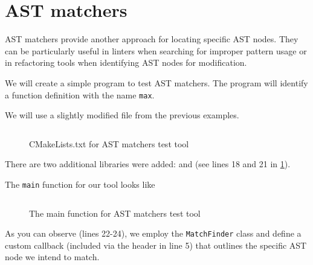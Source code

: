 

\section{AST matchers}
AST matchers provide another approach for locating specific AST nodes. They can
be particularly useful in linters when searching for improper pattern usage or
in refactoring tools when identifying AST nodes for modification.

We will create a simple program to test AST matchers. The program will identify
a function definition with the name \texttt{max}. 

We will use a slightly modified  file from the previous examples.
\begin{figure}[H]
  \inputminted[highlightlines={18,21}]{cmake}{src/part1/ch3_ast/matchvisitor/CMakeLists.txt}
  \caption{CMakeLists.txt for AST matchers test tool}
  \label{lis:ch3:matchervisitor:cmake}
\end{figure}
There are two additional libraries were added:  and
 (see lines 18 and 21 in
\cref{lis:ch3:matchervisitor:cmake}).

The \texttt{main} function for our tool looks like
\begin{figure}[H]
  \inputminted[highlightlines={5,22-24}]{c++}{src/part1/ch3_ast/matchvisitor/MatchVisitor.cpp}
  \caption{The main function for AST matchers test tool}
  \label{lis:ch3:matchervisitor:main}
\end{figure}
As you can observe (lines 22-24), we employ the \texttt{MatchFinder}
class and define a custom callback (included via the header in line 5) that
outlines the specific AST node we intend to match. 


